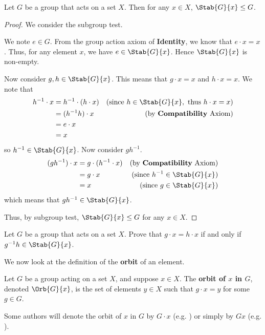 \begin{lemma}\label{lemma-stabilizer-is-subgroup}
    Let $G$ be a group that acts on a set $X$. Then for any $x \in X$, $\Stab{G}{x} \leq G$.
\end{lemma}
\begin{proof}
    We consider the subgroup test.

    We note $e \in G$. From the group action axiom of \textbf{Identity}, we know that $e \cdot x = x$. Thus, for any element $x$, we have $e \in \Stab{G}{x}$. Hence $\Stab{G}{x}$ is non-empty.

    Now consider $g, h \in \Stab{G}{x}$. This means that $g\cdot x = x$ and $h \cdot x = x$. We note that
    \begin{align*}
        h^{-1} \cdot x &= h^{-1} \cdot (h \cdot x) & (\text{since } h \in \Stab{G}{x}, \text{ thus } h\cdot x = x)\\
        &= (h^{-1}h) \cdot x & (\text{by \textbf{Compatibility} Axiom})\\
        &= e \cdot x\\
        &= x
    \end{align*}
    so $h^{-1} \in \Stab{G}{x}$. Now consider $gh^{-1}$.
    \begin{align*}
        (gh^{-1}) \cdot x &= g \cdot (h^{-1} \cdot x) & (\text{by \textbf{Compatibility} Axiom})\\
        &= g \cdot x & (\text{since } h^{-1} \in \Stab{G}{x})\\
        &= x & (\text{since } g \in \Stab{G}{x})
    \end{align*}
    which means that $gh^{-1} \in \Stab{G}{x}$.

    Thus, by subgroup test, $\Stab{G}{x} \leq G$ for any $x \in X$.
\end{proof}

\begin{exercise}\label{exercise-group-action-outputs-equal-iff-gh^-1-in-stabilizer}
    Let $G$ be a group that acts on a set $X$. Prove that $g \cdot x = h \cdot x$ if and only if $g^{-1}h \in \Stab{G}{x}$.
\end{exercise}

We now look at the definition of the \textbf{orbit} of an element.
\begin{definition}
    Let $G$ be a group acting on a set $X$, and suppose $x \in X$. The \textbf{orbit of $x$ in $G$}, denoted $\Orb{G}{x}$, is the set of elements $y \in X$ such that $g \cdot x = y$ for some $g \in G$.
\end{definition}
\begin{remark}
    Some authors will denote the orbit of $x$ in $G$ by $G \cdot x$ (e.g. \cite{clark_1984}) or simply by $Gx$ (e.g. \cite{milne_2021}).
\end{remark}

